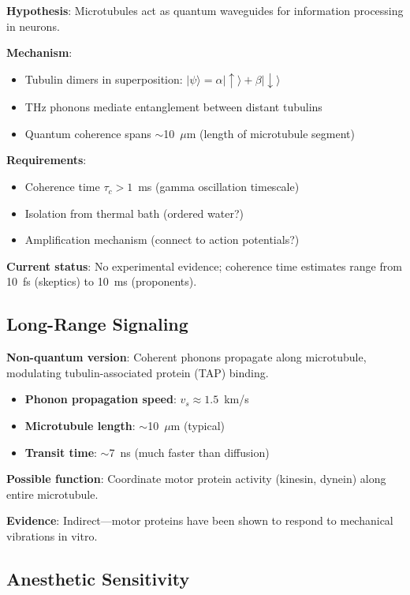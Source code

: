 \textbf{Hypothesis}: Microtubules act as quantum waveguides for information processing in neurons.

\textbf{Mechanism}:
\begin{itemize}
\item Tubulin dimers in superposition: $|\psi\rangle = \alpha|\uparrow\rangle + \beta|\downarrow\rangle$
\item THz phonons mediate entanglement between distant tubulins
\item Quantum coherence spans $\sim$10~$\mu$m (length of microtubule segment)
\end{itemize}

\textbf{Requirements}:
\begin{itemize}
\item Coherence time $\tau_c > 1$~ms (gamma oscillation timescale)
\item Isolation from thermal bath (ordered water?)
\item Amplification mechanism (connect to action potentials?)
\end{itemize}

\textbf{Current status}: No experimental evidence; coherence time estimates range from 10~fs (skeptics) to 10~ms (proponents).

\subsection{Long-Range Signaling}\label{long-range-signaling}

\textbf{Non-quantum version}: Coherent phonons propagate along microtubule, modulating tubulin-associated protein (TAP) binding.

\begin{itemize}
\item \textbf{Phonon propagation speed}: $v_s \approx 1.5$~km/s
\item \textbf{Microtubule length}: $\sim$10~$\mu$m (typical)
\item \textbf{Transit time}: $\sim$7~ns (much faster than diffusion)
\end{itemize}

\textbf{Possible function}: Coordinate motor protein activity (kinesin, dynein) along entire microtubule.

\textbf{Evidence}: Indirect---motor proteins have been shown to respond to mechanical vibrations in vitro.

\subsection{Anesthetic Sensitivity}\label{anesthetic-sensitivity}

